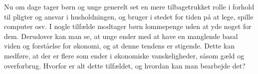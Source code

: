 Nu om dage tager børn og unge generelt set en mere tilbagetrukket rolle i forhold til pligter og ansvar i husholdningen, og bruger i stedet for tiden på at lege, spille computer osv\cite{Boerneliv}. I nogle tilfælde modtager børn lommepenge uden at yde noget for dem. Derudover kan man se, at unge ender med at have en manglende basal viden og forståelse for økonomi, og at denne tendens er stigende\cite{BusinessDK2}. Dette kan medføre, at der er flere som ender i økonomiske vanskeligheder, såsom gæld og overforbrug. Hvorfor er alt dette tilfældet, og hvordan kan man bearbejde det?
